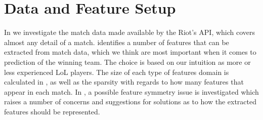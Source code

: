 \section{Data and Feature Setup}\label{sec:features}
In  we investigate the match data made available by the Riot's API, which covers almost any detail of a match.
 identifies a number of features that can be extracted from match data, which we think are most important when it comes to prediction of the winning team. The choice is based on our intuition as more or less experienced LoL players. The size of each type of features domain is calculated in , as well as the sparsity with regards to how many features that appear in each match.
In , a possible feature symmetry issue is investigated which raises a number of concerns and suggestions for solutions as to how the extracted features should be represented. 


